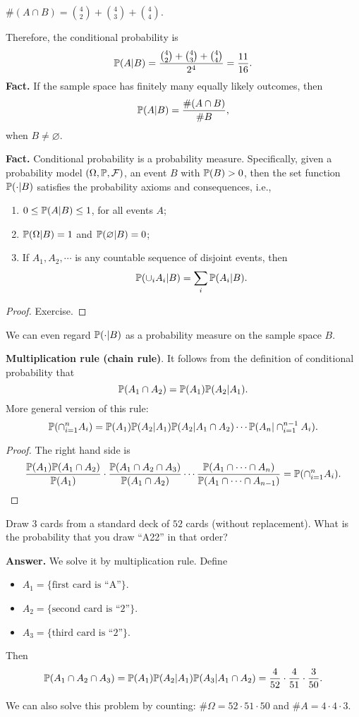 $\# (A\cap B) = \binom{4}{2} + \binom{4}{3} + \binom{4}{4}$.

Therefore, the conditional probability is
\[
  \mathbb{P}(A| B) = \frac{\binom{4}{2} + \binom{4}{3} + \binom{4}{4}}{2^4} = \frac{11}{16}.
\]
\textbf{Fact.} If the sample space has finitely many equally likely outcomes,
then
\[
  \mathbb{P}(A| B) = \frac{\# (A\cap B)}{\# B},
\]
when $B\neq \varnothing$.

\textbf{Fact.} Conditional probability is a probability measure. Specifically,
given a probability model $(\Omega, \mathbb{P}, \mathcal{F})$, an event $B$ with $\mathbb{P}(B)>0$,
then the set function $\mathbb{P}(\cdot| B)$ satisfies the probability axioms and
consequences, i.e.,
\begin{enumerate}[(1)]
\item $0\le \mathbb{P}(A| B) \le 1$, for all events $A$;
\item $\mathbb{P}(\Omega| B) = 1$ and $\mathbb{P}(\varnothing| B) = 0$;
\item If $A_1,A_2,\cdots$ is any countable sequence of disjoint events, then
  \[
    \mathbb{P}(\cup_iA_i | B) = \sum_i\mathbb{P}(A_i| B).
  \]
 \end{enumerate}
  \begin{proof}
    Exercise.
  \end{proof}
  \begin{remark}
    We can even regard $\mathbb{P}(\cdot| B)$ as a probability measure on the sample
    space $B$.
  \end{remark}

  \textbf{Multiplication rule (chain rule)}. It follows from the definition of
  conditional probability that
  \[
    \mathbb{P}(A_1\cap A_2) = \mathbb{P}(A_1) \mathbb{P}(A_2| A_1).
  \]
  More general version of this rule:
  \[
    \mathbb{P}(\cap_{i=1}^n A_i) = \mathbb{P}(A_1)\mathbb{P}(A_2| A_1) \mathbb{P}(A_2| A_1\cap A_2)
    \cdots \mathbb{P}(A_n| \cap_{i=1}^{n-1} A_i).
  \]
\begin{proof}
  The right hand side is
  \[
    \frac{\mathbb{P}(A_1)\mathbb{P}(A_1\cap A_2)}{\mathbb{P}(A_1)}\cdot \frac{\mathbb{P}(A_1\cap A_2\cap
      A_3)}{\mathbb{P}(A_1\cap A_2)}\cdots \frac{\mathbb{P}(A_1\cap\cdots\cap
      A_n)}{\mathbb{P}(A_1\cap\cdots\cap A_{n-1})} = \mathbb{P}(\cap_{i=1}^n A_i).
  \]
\end{proof}
\begin{example}
  Draw $3$ cards from a standard deck of $52$ cards (without replacement). What is the probability
  that you draw ``A22'' in that order?
\end{example}
\textbf{Answer.} We solve it by multiplication rule. Define
\begin{itemize}
\item $A_1 = \{\text{first card is ``A''}\}$.
\item $A_2 = \{\text{second card is ``2''}\}$.
\item $A_3 = \{\text{third card is ``2''}\}$.
\end{itemize}
Then
\[
  \mathbb{P}(A_1\cap A_2\cap A_3) = \mathbb{P}(A_1)\mathbb{P}(A_2|A_1)\mathbb{P}(A_3| A_1\cap
  A_2)=\frac{4}{52}\cdot \frac{4}{51}\cdot \frac{3}{50}.
\]
\begin{remark}
  We can also solve this problem by counting: $\#\Omega = 52\cdot 51\cdot
  50$ and $\# A = 4\cdot 4\cdot 3$. 
\end{remark}

